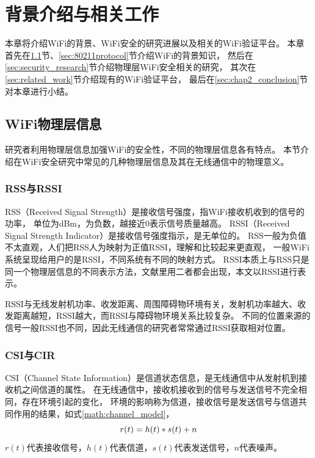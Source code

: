 
\chapter{背景介绍与相关工作}
本章将介绍WiFi的背景、WiFi安全的研究进展以及相关的WiFi验证平台。
本章首先在\ref{sec:comm_principle}节、\ref{sec:80211protocol}节介绍WiFi的背景知识，
然后在\ref{sec:security_research}节介绍物理层WiFi安全相关的研究，
其次在\ref{sec:related_work}节介绍现有的WiFi验证平台，
最后在\ref{sec:chap2_conclusion}节对本章进行小结。

	\section{WiFi物理层信息}\label{sec:comm_principle}
	研究者利用物理层信息加强WiFi的安全性，不同的物理层信息各有特点。
	本节介绍在WiFi安全研究中常见的几种物理层信息及其在无线通信中的物理意义。
		\subsection{RSS与RSSI}
		RSS（Received Signal Strength）是接收信号强度，指WiFi接收机收到的信号的功率，
		单位为dBm，为负数，越接近0表示信号质量越高。
		RSSI（Received Signal Strength Indicator）是接收信号强度指示，是无单位的。
		RSS一般为负值不太直观，人们把RSS人为映射为正值RSSI，理解和比较起来更直观，
		一般WiFi系统呈现给用户的是RSSI，不同系统有不同的映射方式\cite{wikirssi}。
		RSSI本质上与RSS只是同一个物理层信息的不同表示方法，文献里用二者都会出现，本文以RSSI进行表示。

		RSSI与无线发射机功率、收发距离、周围障碍物环境有关，发射机功率越大、收发距离越短，RSSI越大，而RSSI与障碍物环境关系比较复杂。
		不同的位置来源的信号一般RSSI也不同，因此无线通信的研究者常常通过RSSI获取相对位置。

		\subsection{CSI与CIR}\label{sec:background_csi}
		CSI（Channel State Information）是信道状态信息，是无线通信中从发射机到接收机之间信道的属性。
		在无线通信中，接收机接收到的信号与发送信号不完全相同，存在环境引起的变化，
		环境的影响称为信道，接收信号是发送信号与信道共同作用的结果，如式\ref{math:channel_model}，
		\begin{equation}
			\centering
			r(t)=h(t)*s(t)+n
			\label{math:channel_model}
		\end{equation}
		$r(t)$代表接收信号，$h(t)$代表信道，$s(t)$代表发送信号，$n$代表噪声。

